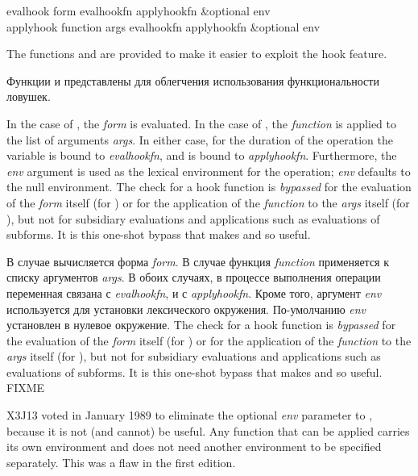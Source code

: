 \begin{defun}[Function]
evalhook form evalhookfn applyhookfn &optional env \\
applyhook function args evalhookfn applyhookfn &optional env

The functions  and  are provided to make it
easier to exploit the hook feature.

Функции  и  представлены для облегчения
использования функциональности ловушек.

In the case of , the \emph{form} is evaluated.
In the case of , the \emph{function} is applied to the
list of arguments \emph{args}.  In either case,
for the duration of the operation
the variable  is bound to \emph{evalhookfn}, and
 is bound to \emph{applyhookfn}.
Furthermore, the \emph{env} argument
is used as the lexical environment for the operation;
\emph{env} defaults to the null environment.
The check for a hook function is \emph{bypassed} for the evaluation
of the \emph{form} itself (for ) or for the application
of the \emph{function} to the \emph{args} itself (for ),
but not for subsidiary evaluations and applications
such as evaluations of subforms.  It is this one-shot bypass that makes
 and  so useful.

В случае  вычисляется форма \emph{form}.
В случае  функция \emph{function} применяется к списку аргументов
\emph{args}.
В обоих случаях, в процессе выполнения операции переменная 
связана с \emph{evalhookfn}, и  с \emph{applyhookfn}.
Кроме того, аргумент \emph{env} используется для установки лексического
окружения.
По-умолчанию \emph{env} установлен в нулевое окружение.
The check for a hook function is \emph{bypassed} for the evaluation
of the \emph{form} itself (for ) or for the application
of the \emph{function} to the \emph{args} itself (for ),
but not for subsidiary evaluations and applications
such as evaluations of subforms.  It is this one-shot bypass that makes
 and  so useful. FIXME

\begin{new}
X3J13 voted in January 1989
to eliminate the optional \emph{env}
parameter to , because it is not (and cannot)
be useful.  Any function that can be applied carries its own
environment and does not need another environment to be specified
separately.
This was a flaw in the first edition.
\end{new}


\end{defun}
